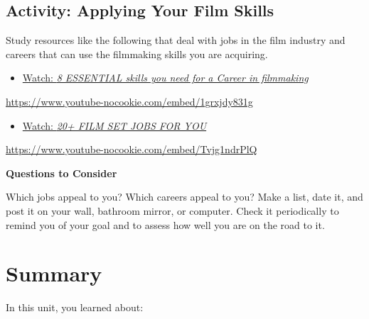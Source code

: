 \documentclass[
  letterpaper,
  DIV=11,
  numbers=noendperiod]{scrreprt}
\providecommand{\tightlist}{%
  \setlength{\itemsep}{0pt}\setlength{\parskip}{0pt}}\usepackage{longtable,booktabs,array}
\begin{document}
\subsection{Activity: Applying Your Film
Skills}\label{activity-applying-your-film-skills}

\begin{tcolorbox}[enhanced jigsaw, titlerule=0mm, leftrule=.75mm, bottomrule=.15mm, colback=white, left=2mm, opacitybacktitle=0.6, title={Learning Activity}, colbacktitle=quarto-callout-note-color!10!white, colframe=quarto-callout-note-color-frame, bottomtitle=1mm, toptitle=1mm, opacityback=0, rightrule=.15mm, breakable, arc=.35mm, toprule=.15mm, coltitle=black]

Study resources like the following that deal with jobs in the film
industry and careers that can use the filmmaking skills you are
acquiring.

\begin{itemize}
\tightlist
\item
  \href{https://www.youtube.com/watch?v=1grxjdy831g}{Watch: \emph{8
  ESSENTIAL skills you need for a Career in filmmaking}}
\end{itemize}

\url{https://www.youtube-nocookie.com/embed/1grxjdy831g}

\begin{itemize}
\tightlist
\item
  \href{https://www.youtube.com/watch?v=Tvjg1ndrPlQ}{Watch: \emph{20+
  FILM SET JOBS FOR YOU}}
\end{itemize}

\url{https://www.youtube-nocookie.com/embed/Tvjg1ndrPlQ}

\textbf{Questions to Consider}

Which jobs appeal to you? Which careers appeal to you? Make a list, date
it, and post it on your wall, bathroom mirror, or computer. Check it
periodically to remind you of your goal and to assess how well you are
on the road to it.

\end{tcolorbox}

\section*{Summary}\label{summary-9}


In this unit, you learned about:
\end{document}
